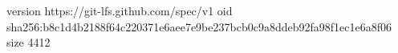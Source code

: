version https://git-lfs.github.com/spec/v1
oid sha256:b8c1d4b2188f64c220371e6aee7e9be237bcb0c9a8ddeb92fa98f1ec1e6a8f06
size 4412
